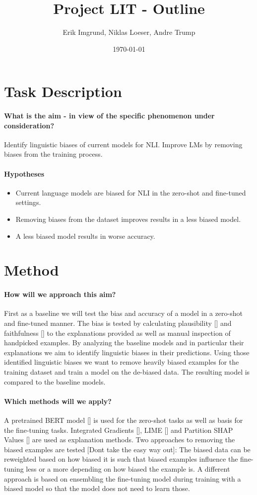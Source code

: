 \documentclass[12pt,a4paper]{article}
\title{Project LIT - Outline}
\author{Erik Imgrund, Niklas Loeser, Andre Trump}
\date{\today}
\begin{document}
\maketitle

\section{Task Description}
\paragraph{What is the aim - in view of the specific phenomenon under consideration?}
Identify linguistic biases of current models for NLI. Improve LMs by removing biases from the training process.

\paragraph{Hypotheses}
\begin{itemize}
    \item Current language models are biased for NLI in the zero-shot and fine-tuned settings.
    \item Removing biases from the dataset improves results in a less biased model.
    \item A less biased model results in worse accuracy.
\end{itemize}

\section{Method}
\paragraph{How will we approach this aim?}
First as a baseline we will test the bias and accuracy of a model in a zero-shot and fine-tuned manner. The bias is tested by calculating plausibility [] and faithfulness [] to the explanations provided as well as manual inspection of handpicked examples. By analyzing the baseline models and in particular their explanations we aim to identify linguistic biases in their predictions. Using those identified linguistic biases we want to remove heavily biased examples for the training dataset and train a model on the de-biased data. The resulting model is compared to the baseline models.

\paragraph{Which methods will we apply?}
A pretrained BERT model [] is used for the zero-shot tasks as well as basis for the fine-tuning tasks. Integrated Gradients [], LIME [] and Partition SHAP Values [] are used as explanation methods. Two approaches to removing the biased examples are tested [Dont take the easy way out]: The biased data can be reweighted based on how biased it is such that biased examples influence the fine-tuning less or a more depending on how biased the example is. A different approach is based on ensembling the fine-tuning model during training with a biased model so that the model does not need to learn those.
\end{document}
